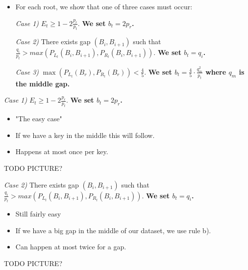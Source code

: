 \documentclass{beamer}
\theoremstyle{plain}
\begin{document}
\begin{frame}

\begin{itemize}
\item For each root, we show that one of three cases must occur:

\item[\textit{Case 1)}] $E_t \geq 1-2 \frac{p_r}{p_t}$. \textbf{We set $b_t = 2p_r$.}

\item[\textit{Case 2)}] There exists gap $(B_i, B_{i+1})$ such that $\frac{q_i}{p_t} > max(P_{L_t}(B_i, B_{i+1}), P_{R_t}(B_i, B_{i+1}))$. \textbf{We set $b_t = q_i$.}

\item[\textit{Case 3)}]  $\max(P_{L_t}(B_r), P_{R_t}(B_r)) < \frac{4}{5}$. \textbf{We set $b_t = \frac{4}{5} \cdot \frac{q_m^2}{p_t}$ where $q_m$ is the middle gap.}

\end{itemize}


\end{frame}

\begin{frame}

\textit{Case 1)} $E_t \geq 1-2 \frac{p_r}{p_t}$. \textbf{We set $b_t = 2p_r$.}


\begin{itemize}
\item "The easy case"
\item If we have a key in the middle this will follow.
\item Happens at most once per key.
\end{itemize}
TODO PICTURE?
\end{frame}
\begin{frame}
\textit{Case 2)} There exists gap $(B_i, B_{i+1})$ such that $\frac{q_i}{p_t} > max(P_{L_t}(B_i, B_{i+1}), P_{R_t}(B_i, B_{i+1}))$. \textbf{We set $b_t = q_i$.}
\begin{itemize}
\item Still fairly easy
\item If we have a big gap in the middle of our dataset, we use rule b).
\item Can happen at most twice for a gap.
\end{itemize}
TODO PICTURE?
\end{frame}
\end{document}
